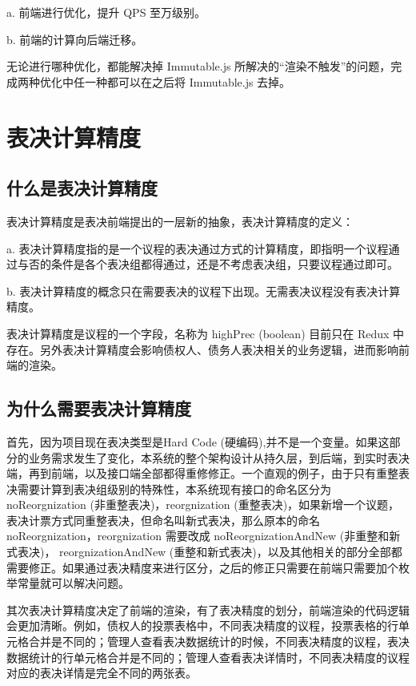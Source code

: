   \quad{}a. 前端进行优化，提升 QPS 至万级别。

  \quad{}b. 前端的计算向后端迁移。

  无论进行哪种优化，都能解决掉 Immutable.js 所解决的“渲染不触发”的问题，完成两种优化中任一种都可以在之后将 Immutable.js 去掉。

  \section{表决计算精度}
  \subsection{什么是表决计算精度}
  表决计算精度是表决前端提出的一层新的抽象，表决计算精度的定义：

  \quad{}a. 表决计算精度指的是一个议程的表决通过方式的计算精度，即指明一个议程通过与否的条件是各个表决组都得通过，还是不考虑表决组，只要议程通过即可。


  \quad{}b. 表决计算精度的概念只在需要表决的议程下出现。无需表决议程没有表决计算精度。

  表决计算精度是议程的一个字段，名称为 highPrec (boolean) 目前只在 Redux 中存在。另外表决计算精度会影响债权人、债务人表决相关的业务逻辑，进而影响前端的渲染。

  \subsection{为什么需要表决计算精度}

  首先，因为项目现在表决类型是Hard Code (硬编码),并不是一个变量。如果这部分的业务需求发生了变化，本系统的整个架构设计从持久层，到后端，到实时表决端，再到前端，以及接口端全部都得重修修正。一个直观的例子，由于只有重整表决需要计算到表决组级别的特殊性，本系统现有接口的命名区分为 noReorgnization (非重整表决)，reorgnization (重整表决)，如果新增一个议题，表决计票方式同重整表决，但命名叫新式表决，那么原本的命名 noReorgnization，reorgnization 需要改成 noReorgnizationAndNew (非重整和新式表决)， reorgnizationAndNew (重整和新式表决)，以及其他相关的部分全部都需要修正。如果通过表决精度来进行区分，之后的修正只需要在前端只需要加个枚举常量就可以解决问题。

  其次表决计算精度决定了前端的渲染，有了表决精度的划分，前端渲染的代码逻辑会更加清晰。例如，债权人的投票表格中，不同表决精度的议程，投票表格的行单元格合并是不同的；管理人查看表决数据统计的时候，不同表决精度的议程，表决数据统计的行单元格合并是不同的；管理人查看表决详情时，不同表决精度的议程对应的表决详情是完全不同的两张表。
  
